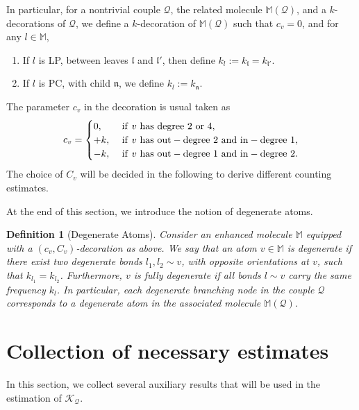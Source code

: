 \documentclass[UTF-8,reqno]{amsart}
\numberwithin{equation}{section}
\newtheorem{definition}[theorem]{Definition}
\theoremstyle{definition}
\begin{document}
In particular, for a nontrivial couple $\mathcal{Q}$, the related molecule $\mathbb{M}(\mathcal{Q})$, and a $k$-decorations of $\mathcal{Q}$, we define a $k$-decoration of $\mathbb M(\mathcal Q)$ such that $c_v=0$, and for any $l\in\mathbb{M}$,
\begin{enumerate}
\item 
 If $l$ is LP, between leaves $\mathfrak{l}$ and $\mathfrak{l}'$, then define $k_l := k_{\mathfrak{l}} = k_{\mathfrak{l}'}$.
 \item  If $l$ is PC, with child $\mathfrak{n}$, we define $k_l := k_{\mathfrak{n}}$.
 \end{enumerate}
 The parameter $c_v$ in the decoration is usual taken as 
 \begin{equation*}%
c_v=\begin{cases}
   0,& {\rm 
\ if}\ v {\rm\ has\ degree\ 2\ or\ 4},\\
 +k,&{\rm 
\ if}\ v {\rm\ has\ out-degree\ 2\ and\ in-degree\ 1},\\
 -k,& {\rm 
\ if}\ v {\rm\ has\ out-degree\ 1\ and\ in-degree\ 2}. 
\end{cases}
\end{equation*}
The choice of  $C_v$ will be decided in the following to derive different counting estimates.

At the end of this section, we introduce the notion of degenerate atoms.


\begin{definition}[Degenerate Atoms]
\label{def:degenerate-atoms}
Consider an enhanced molecule $\mathbb{M}$ equipped with a $(c_v,C_v)$-decoration as above. We say that an atom $v \in \mathbb{M}$ is degenerate if there exist two degenerate bonds $l_1, l_2 \sim v$, with opposite orientations at $v$, such that $k_{l_1}=k_{l_2}$. Furthermore, $v$ is fully degenerate if all bonds $l\sim v$ carry the same frequency $k_l$.
In particular, each degenerate branching node in the couple $\mathcal{Q}$ corresponds to a degenerate atom in the associated molecule $\mathbb{M}(\mathcal{Q})$. 
\end{definition}

\section{Collection of necessary estimates}\label{sec:mainest}
In this section, we collect several auxiliary results that will be used in the estimation of $\mathcal{K}_{\mathcal{Q}}$.
\end{document}
